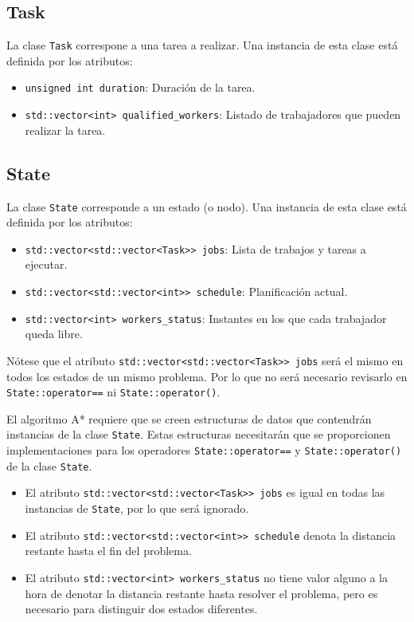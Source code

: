 \subsection{Task}

La clase \lstinline{Task} correspone a una tarea a realizar.
Una instancia de esta clase está definida por los atributos:
\begin{itemize}[itemsep=0.25px]
    \item \lstinline{unsigned int duration}: Duración de la tarea.
    \item \lstinline{std::vector<int> qualified_workers}: Listado de trabajadores que pueden realizar la tarea.
\end{itemize}

\subsection{State}

La clase \lstinline{State} corresponde a un estado (o nodo).
Una instancia de esta clase está definida por los atributos:
\begin{itemize}[itemsep=0.25px]
    \item \lstinline{std::vector<std::vector<Task>> jobs}: Lista de trabajos y tareas a ejecutar.
    \item \lstinline{std::vector<std::vector<int>> schedule}: Planificación actual.
    \item \lstinline{std::vector<int> workers_status}: Instantes en los que cada trabajador queda libre.
\end{itemize}

\begin{notebox}
    Nótese que el atributo \lstinline{std::vector<std::vector<Task>> jobs} será el mismo
    en todos los estados de un mismo problema.
    Por lo que no será necesario revisarlo en
    \lstinline{State::operator==} ni \lstinline{State::operator()}.
\end{notebox}

El algoritmo A* requiere que se creen estructuras de datos que contendrán instancias
de la clase \lstinline{State}.
Estas estructuras necesitarán que se proporcionen implementaciones para los operadores
\lstinline{State::operator==} y \lstinline{State::operator()} de la clase \lstinline{State}.

\begin{itemize}[itemsep=0.25px]
    \item El atributo \lstinline{std::vector<std::vector<Task>> jobs} es igual en todas las
    instancias de \lstinline{State}, por lo que será ignorado.
    \item El atributo \lstinline{std::vector<std::vector<int>> schedule} denota
    la distancia restante hasta el fin del problema.
    \item El atributo \lstinline{std::vector<int> workers_status} no tiene valor alguno
    a la hora de denotar la distancia restante hasta resolver el problema,
    pero es necesario para distinguir dos estados diferentes.
\end{itemize}

